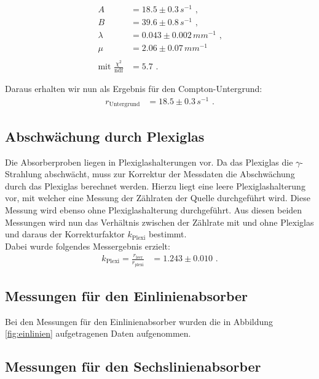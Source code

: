 \begin{align*}
		A&=18.5\pm0.3\,\si{s^{-1}}\text{ ,}\\
		B&=39.6\pm0.8\,\si{s^{-1}}\text{ ,}\\
		\lambda&=0.043\pm0.002\,\si{mm^{-1}}\text{ ,}\\
		\mu&=2.06\pm0.07\,\si{mm^{-1}}\\
		\ \\
		\text{mit }\frac{\chi^2}{\mathrm{ndf}}&=5.7\text{ .}
\end{align*}

Daraus erhalten wir nun als Ergebnis für den Compton-Untergrund:
\begin{align}
	r_\text{Untergrund}&=18.5\pm0.3\,\si{s^{-1}}\text{ .}
\end{align}

\subsection{Abschwächung durch Plexiglas}

Die Absorberproben liegen in Plexiglashalterungen vor. Da das Plexiglas die $\gamma$-Strahlung abschwächt, muss zur Korrektur der Messdaten die Abschwächung durch das Plexiglas berechnet werden. Hierzu liegt eine leere Plexiglashalterung vor, mit welcher eine Messung der Zählraten der Quelle durchgeführt wird. Diese Messung wird ebenso ohne Plexiglashalterung durchgeführt. Aus diesen beiden Messungen wird nun das Verhältnis zwischen der Zählrate mit und ohne Plexiglas und daraus der Korrekturfaktor $k_\text{Plexi}$ bestimmt.\\

Dabei wurde folgendes Messergebnis erzielt:
\begin{align}
	k_\text{Plexi}=\frac{r_\text{leer}}{r_\text{plexi}}&=1.243\pm0.010\text{ .}
\end{align}

\subsection{Messungen für den Einlinienabsorber}
Bei den Messungen für den Einlinienabsorber wurden die in Abbildung \ref{fig:einlinien} aufgetragenen Daten aufgenommen.


\subsection{Messungen für den Sechslinienabsorber}
